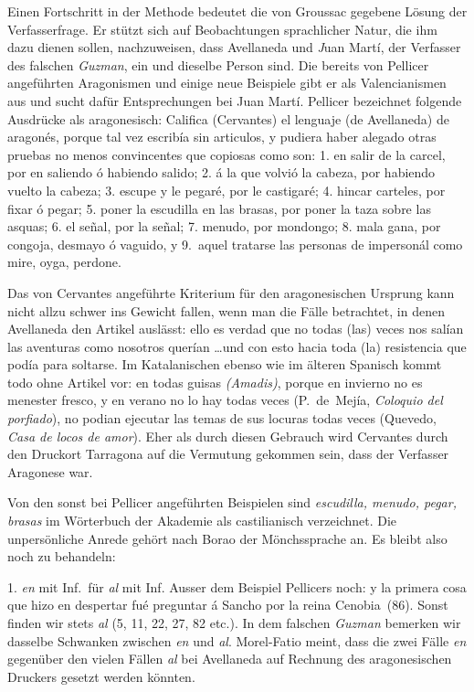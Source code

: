 Einen Fortschritt in der Methode bedeutet die von Groussac
gegebene Lösung der Verfasserfrage. Er stützt sich auf Beobachtungen
sprachlicher Natur, die ihm dazu dienen sollen, nachzuweisen, dass
Avellaneda und {\emph Juan Martí,} der Verfasser des falschen {\it Guzman}, ein und
dieselbe Person sind. Die bereits von Pellicer angeführten Aragonismen
und einige neue Beispiele gibt er als Valencianismen aus und sucht
dafür Entsprechungen bei Juan Martí. Pellicer bezeichnet folgende
Ausdrücke als aragonesisch: {\itquoted Califica {\rm (Cervantes)} el lenguaje
{\rm (de Avellaneda)} de aragonés, porque tal vez escribía sin articulos, y pudiera
haber alegado otras pruebas no menos convincentes que copiosas como
son: 1. en salir de la carcel, por en saliendo ó habiendo salido; 2. á la
que volvió la cabeza, por habiendo vuelto la cabeza; 3. escupe y le
pegaré, por le castigaré; 4. hincar carteles, por fixar ó pegar; 5. poner
la escudilla en las brasas, por poner la taza sobre las asquas; 6. el señal,
por la señal; 7. menudo, por mondongo; 8. mala gana, por congoja,
desmayo ó vaguido, y 9.~aquel tratarse las personas de impersonál como
\glq{}mire, oyga, perdone\grq.}

Das von Cervantes angeführte Kriterium für den aragonesischen
Ursprung kann nicht allzu schwer ins Gewicht fallen, wenn man die
Fälle betrachtet, in denen Avellaneda den Artikel auslässt: {\itquoted ello es verdad
que no todas (las) veces nos salían las aventuras como nosotros
querían} \dots und {\itquoted con esto hacia toda (la) resistencia que podía para
soltarse.} Im Katalanischen ebenso wie im älteren
Spanisch kommt todo ohne Artikel vor: {\itquoted en todas guisas} {\it (Amadis)},
{\itquoted porque en invierno
no es menester fresco, y en verano no lo hay todas veces} (P.~de~Mejía,
{\it Coloquio del porfiado\/}), {\itquoted no podian ejecutar las temas de sus locuras
todas veces} (Quevedo, {\it Casa de locos de amor\/}). Eher als durch diesen
Gebrauch wird Cervantes durch den Druckort Tarragona auf die Vermutung
gekommen sein, dass der Verfasser Aragonese war.

Von den sonst bei Pellicer angeführten Beispielen sind {\it escudilla,
menudo, pegar, brasas} im Wörterbuch der Akademie als castilianisch
verzeichnet. Die unpersönliche Anrede gehört nach Borao
der Mönchssprache an. Es bleibt also noch zu behandeln:

1. {\it en} mit Inf.\ für {\it al} mit Inf. Ausser dem Beispiel Pellicers noch:
{\itquoted\spanish y la primera cosa que hizo en despertar fué preguntar á Sancho por
la reina Cenobia}~(86). Sonst finden wir stets {\it al} (5, 11, 22,
27, 82 etc.). In dem falschen {\it Guzman} bemerken wir dasselbe
Schwanken zwischen {\it en} und {\it al}. Morel-Fatio meint, dass die zwei Fälle
{\it en} gegenüber den vielen Fällen {\it al} bei Avellaneda auf Rechnung des
aragonesischen Druckers gesetzt werden könnten.

